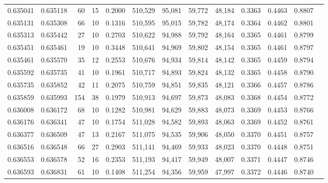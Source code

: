 \begin{tabular}{rrrrrrrrrrrrr}
0.635041 & 0.635118 &    60 &  15 &                                     0.2000 & 510,529 &  95,081 &  59,772 &  48,184 & 0.3363 & 0.4463 & 0.8807 \\
0.635131 & 0.635308 &    66 &  10 &                                     0.1316 & 510,595 &  95,015 &  59,782 &  48,174 & 0.3364 & 0.4462 & 0.8801 \\
0.635313 & 0.635442 &    27 &  10 &                                     0.2703 & 510,622 &  94,988 &  59,792 &  48,164 & 0.3365 & 0.4461 & 0.8799 \\
0.635451 & 0.635461 &    19 &  10 &                                     0.3448 & 510,641 &  94,969 &  59,802 &  48,154 & 0.3365 & 0.4461 & 0.8797 \\
0.635461 & 0.635570 &    35 &  12 &                                     0.2553 & 510,676 &  94,934 &  59,814 &  48,142 & 0.3365 & 0.4459 & 0.8794 \\
0.635592 & 0.635735 &    41 &  10 &                                     0.1961 & 510,717 &  94,893 &  59,824 &  48,132 & 0.3365 & 0.4458 & 0.8790 \\
0.635735 & 0.635852 &    42 &  11 &                                     0.2075 & 510,759 &  94,851 &  59,835 &  48,121 & 0.3366 & 0.4457 & 0.8786 \\
0.635859 & 0.635993 &   154 &  38 &                                     0.1979 & 510,913 &  94,697 &  59,873 &  48,083 & 0.3368 & 0.4454 & 0.8772 \\
0.636008 & 0.636172 &    68 &  10 &                                     0.1282 & 510,981 &  94,629 &  59,883 &  48,073 & 0.3369 & 0.4453 & 0.8766 \\
0.636176 & 0.636341 &    47 &  10 &                                     0.1754 & 511,028 &  94,582 &  59,893 &  48,063 & 0.3369 & 0.4452 & 0.8761 \\
0.636377 & 0.636509 &    47 &  13 &                                     0.2167 & 511,075 &  94,535 &  59,906 &  48,050 & 0.3370 & 0.4451 & 0.8757 \\
0.636516 & 0.636548 &    66 &  27 &                                     0.2903 & 511,141 &  94,469 &  59,933 &  48,023 & 0.3370 & 0.4448 & 0.8751 \\
0.636553 & 0.636578 &    52 &  16 &                                     0.2353 & 511,193 &  94,417 &  59,949 &  48,007 & 0.3371 & 0.4447 & 0.8746 \\
0.636593 & 0.636831 &    61 &  10 &                                     0.1408 & 511,254 &  94,356 &  59,959 &  47,997 & 0.3372 & 0.4446 & 0.8740 \\

\end{tabular}
